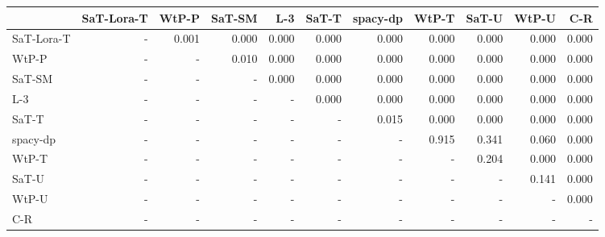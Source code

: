 \begin{tabular}{lrrrrrrrrrr}
\toprule
 & SaT-Lora-T & WtP-P & SaT-SM & L-3 & SaT-T & spacy-dp & WtP-T & SaT-U & WtP-U & C-R \\
\midrule
SaT-Lora-T & - & 0.001 & 0.000 & 0.000 & 0.000 & 0.000 & 0.000 & 0.000 & 0.000 & 0.000 \\
WtP-P & - & - & 0.010 & 0.000 & 0.000 & 0.000 & 0.000 & 0.000 & 0.000 & 0.000 \\
SaT-SM & - & - & - & 0.000 & 0.000 & 0.000 & 0.000 & 0.000 & 0.000 & 0.000 \\
L-3 & - & - & - & - & 0.000 & 0.000 & 0.000 & 0.000 & 0.000 & 0.000 \\
SaT-T & - & - & - & - & - & 0.015 & 0.000 & 0.000 & 0.000 & 0.000 \\
spacy-dp & - & - & - & - & - & - & 0.915 & 0.341 & 0.060 & 0.000 \\
WtP-T & - & - & - & - & - & - & - & 0.204 & 0.000 & 0.000 \\
SaT-U & - & - & - & - & - & - & - & - & 0.141 & 0.000 \\
WtP-U & - & - & - & - & - & - & - & - & - & 0.000 \\
C-R & - & - & - & - & - & - & - & - & - & - \\
\bottomrule
\end{tabular}

